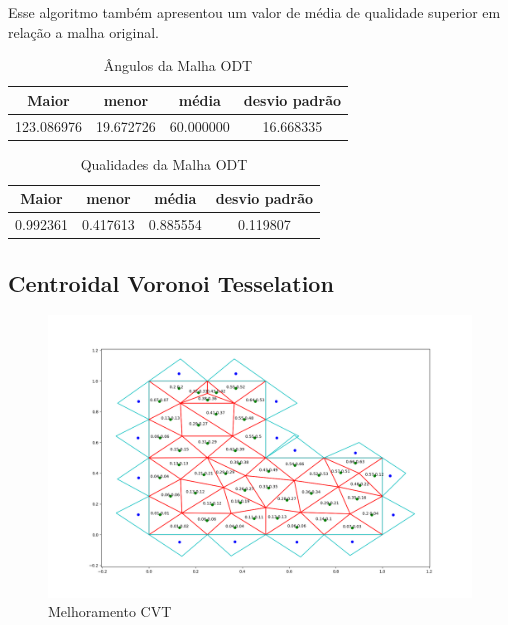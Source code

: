 Esse algoritmo também apresentou um valor de média de qualidade superior em relação a malha original.

\begin{table}[hb]
\centering
\par\caption{Ângulos da Malha ODT}
\begin{tabular}{c|c|c|c}
Maior&menor&média&desvio padrão\\\hline\hline
123.086976&19.672726&60.000000&16.668335\\\hline
\end{tabular}
\label{tab:angulos-malha-odt}
\end{table}

\begin{table}[hb]
\centering
\par\caption{Qualidades da Malha ODT}
\begin{tabular}{c|c|c|c}
Maior&menor&média&desvio padrão\\\hline\hline
0.992361&0.417613&0.885554&0.119807\\\hline
\end{tabular}
\label{tab:qualidades-malha-odt}
\end{table}

\newpage
\subsection{Centroidal Voronoi Tesselation}

\begin{figure}[ht]
    \centering
    \includegraphics[width=1\linewidth]{fig/malha-cvt.png}
    \caption{Melhoramento CVT}
    \label{fig:malha-cvt}
\end{figure}

